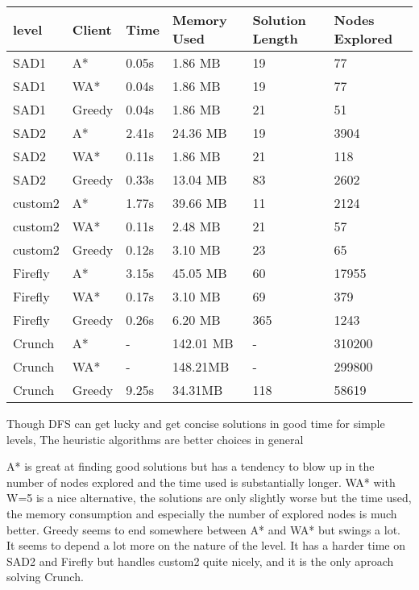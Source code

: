\documentclass{article}
\begin{document}
\begin{tabular}{l|l|l|l|l|l}
  level & Client & Time & Memory Used & Solution Length & Nodes Explored\\\hline
  SAD1 & A* & 0.05s & 1.86 MB & 19 & 77\\
  SAD1 & WA* & 0.04s & 1.86 MB & 19 & 77\\
  SAD1 & Greedy & 0.04s & 1.86 MB & 21 & 51\\
  \hline
  SAD2 & A* & 2.41s & 24.36 MB  & 19 & 3904\\
  SAD2 & WA* & 0.11s & 1.86 MB  & 21 & 118\\
  SAD2 & Greedy & 0.33s & 13.04 MB  & 83 & 2602\\
  \hline
  custom2 & A* & 1.77s & 39.66 MB & 11 & 2124\\
  custom2 & WA* & 0.11s & 2.48 MB & 21 & 57\\
  custom2 & Greedy & 0.12s & 3.10 MB & 23 & 65\\
  \hline
  Firefly & A* & 3.15s & 45.05 MB & 60 & 17955\\
  Firefly & WA* & 0.17s & 3.10 MB & 69 & 379\\
  Firefly & Greedy & 0.26s & 6.20 MB & 365 & 1243\\
  \hline
  Crunch & A* & - & 142.01 MB & - & 310200\\
  Crunch & WA* & - & 148.21MB & - & 299800\\
  Crunch & Greedy & 9.25s & 34.31MB & 118 & 58619\\
\end{tabular}

Though DFS can get lucky and get concise solutions in good time for simple
levels, The heuristic algorithms are better choices in general

A* is great at finding good solutions but has a tendency to blow up in the
number of nodes explored and the time used is substantially longer.
WA* with W=5 is a nice alternative, the solutions are only slightly worse but
the time used, the memory consumption and especially the number of explored
nodes is much better.
Greedy seems to end somewhere between A* and WA* but swings a lot. It seems to
depend a lot more on the nature of the level. It has a harder time on SAD2 and
Firefly but handles custom2 quite nicely, and it is the only aproach solving
Crunch.
\end{document}
